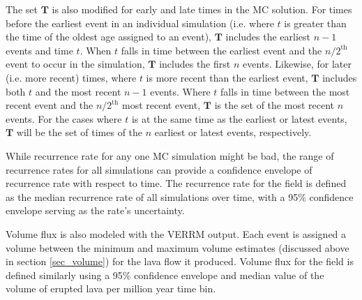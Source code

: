 \documentclass[12pt,letter]{article}
\begin{document}
The set $\mathbf{T}$ is also modified for early and late times in the MC solution. For times before the earliest event in an individual simulation (i.e. where $t$ is greater than the time of the oldest age assigned to an event), $\mathbf{T}$ includes the earliest $n-1$ events and time $t$. When $t$ falls in time between the earliest event and the $n/2^{\text{th}}$ event to occur in the simulation, $\mathbf{T}$ includes the first $n$ events. Likewise, for later (i.e. more recent) times, where $t$ is more recent than the earliest event, $\mathbf{T}$ includes both $t$ and the most recent $n-1$ events. Where $t$ falls in time between the most recent event and the $n/2^{\text{th}}$ most recent event, $\mathbf{T}$ is the set of the most recent $n$ events. For the cases where $t$ is at the same time as the earliest or latest events, $\mathbf{T}$ will be the set of times of the $n$ earliest or latest events, respectively.

While recurrence rate for any one MC simulation might be bad, the range of recurrence rates for all simulations can provide a confidence envelope of recurrence rate with respect to time. The recurrence rate for the field is defined as the median recurrence rate of all simulations over time, with a 95\% confidence envelope serving as the rate's uncertainty.

Volume flux is also modeled with the VERRM output. Each event is assigned a volume between the minimum and maximum volume estimates (discussed above in section \ref{sec_volume}) for the lava flow it produced. Volume flux for the field is defined similarly using a 95\% confidence envelope and median value of the volume of erupted lava per million year time bin.
\end{document}
